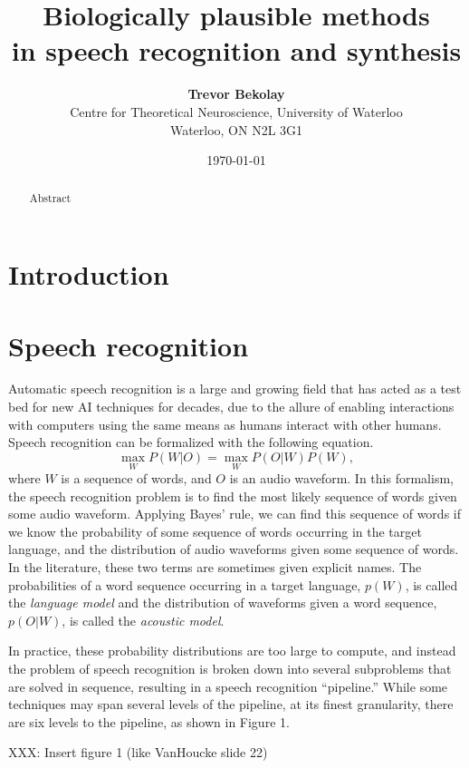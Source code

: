 \documentclass{article}
\title{\bf Biologically plausible methods \\
  in speech recognition and synthesis}
\date{\today}
\author{{\bf Trevor Bekolay} \\
  Centre for Theoretical Neuroscience, University of Waterloo \\
  Waterloo, ON  N2L 3G1}
\begin{document}
\maketitle

\begin{abstract}
  Abstract
\end{abstract}

\section{Introduction}

\section{Speech recognition}

Automatic speech recognition
is a large and growing field
that has acted as a test bed
for new AI techniques for decades,
due to the allure of enabling
interactions with computers
using the same means
as humans interact with other humans.
Speech recognition can be formalized
with the following equation.
\begin{equation}
  \max_W P(W|O) = \max_W P(O|W) P(W),
\end{equation}
where $W$ is a sequence of words,
and $O$ is an audio waveform.
In this formalism, the speech recognition problem
is to find the most likely sequence of words
given some audio waveform.
Applying Bayes' rule, we can find
this sequence of words
if we know the probability
of some sequence of words occurring
in the target language,
and the distribution of audio waveforms
given some sequence of words.
In the literature, these two terms
are sometimes given explicit names.
The probabilities of a word sequence
occurring in a target language,
$p(W)$, is called the \textit{language model}
and the distribution of waveforms
given a word sequence, $p(O|W)$,
is called the \textit{acoustic model}.

In practice, these probability distributions
are too large to compute,
and instead the problem of speech recognition
is broken down into several subproblems
that are solved in sequence,
resulting in a speech recognition ``pipeline.''
While some techniques may span several levels
of the pipeline, at its finest granularity,
there are six levels to the pipeline,
as shown in Figure 1.

XXX: Insert figure 1 (like VanHoucke slide 22)
\end{document}
